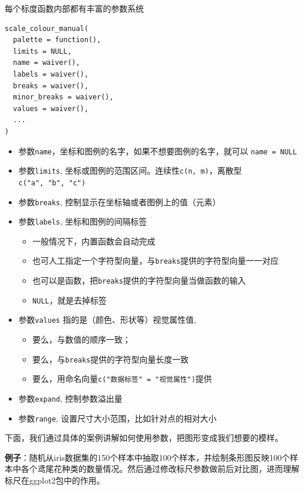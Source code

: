 \documentclass[
]{book}
\providecommand{\tightlist}{%
  \setlength{\itemsep}{0pt}\setlength{\parskip}{0pt}}
\begin{document}
每个标度函数内部都有丰富的参数系统

\begin{verbatim}
scale_colour_manual(
  palette = function(), 
  limits = NULL,
  name = waiver(),
  labels = waiver(),
  breaks = waiver(),
  minor_breaks = waiver(),
  values = waiver(),
  ...
)
\end{verbatim}

\begin{itemize}
\item
  参数\texttt{name}，坐标和图例的名字，如果不想要图例的名字，就可以
  \texttt{name\ =\ NULL}
\item
  参数\texttt{limits},
  坐标或图例的范围区间。连续性\texttt{c(n,\ m)}，离散型\texttt{c("a",\ "b",\ "c")}
\item
  参数\texttt{breaks}, 控制显示在坐标轴或者图例上的值（元素）
\item
  参数\texttt{labels}, 坐标和图例的间隔标签

  \begin{itemize}
  \tightlist
  \item
    一般情况下，内置函数会自动完成
  \item
    也可人工指定一个字符型向量，与\texttt{breaks}提供的字符型向量一一对应
  \item
    也可以是函数，把\texttt{breaks}提供的字符型向量当做函数的输入
  \item
    \texttt{NULL}，就是去掉标签
  \end{itemize}
\item
  参数\texttt{values} 指的是（颜色、形状等）视觉属性值,

  \begin{itemize}
  \tightlist
  \item
    要么，与数值的顺序一致；
  \item
    要么，与\texttt{breaks}提供的字符型向量长度一致
  \item
    要么，用命名向量\texttt{c("数据标签"\ =\ "视觉属性")}提供
  \end{itemize}
\item
  参数\texttt{expand}, 控制参数溢出量
\item
  参数\texttt{range}, 设置尺寸大小范围，比如针对点的相对大小
\end{itemize}

下面，我们通过具体的案例讲解如何使用参数，把图形变成我们想要的模样。

\textbf{例子}：随机从iris数据集的150个样本中抽取100个样本，并绘制条形图反映100个样本中各个鸢尾花种类的数量情况。然后通过修改标尺参数做前后对比图，进而理解标尺在ggplot2包中的作用。
\end{document}
